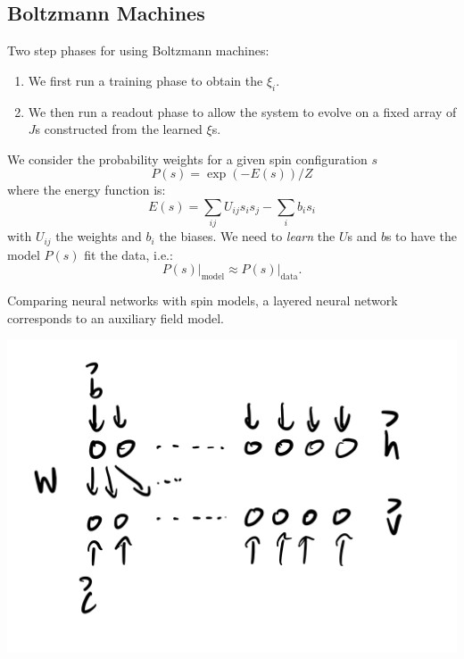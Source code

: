 \subsection{Boltzmann Machines}
Two step phases for using Boltzmann machines:
\begin{enumerate}
    \item We first run a training phase to obtain the $\xi_i$.
    \item We then run a readout phase to allow the system to evolve on a fixed array of $J$s constructed from the learned $\xi$s.
\end{enumerate}

We consider the probability weights for a given spin configuration $s$
\begin{equation}
    P(s) = \exp(-E(s))/Z
\end{equation}
where the energy function is:
\begin{equation}
    E(s) = \sum_{ij}U_{ij}s_is_j - \sum_i b_i s_i
\end{equation}
with $U_{ij}$ the weights and $b_i$ the biases. We need to \emph{learn} the $U$s and $b$s to have the model $P(s)$ fit the data, i.e.:
\begin{equation}
    \left.P(s)\right|_{\text{model}} \approx \left.P(s)\right|_{\text{data}}.
\end{equation}

Comparing neural networks with spin models, a layered neural network corresponds to an auxiliary field model.

\begin{center}
    \includegraphics[scale=0.35]{Lectures/Figures/lec15-NN.png}
\end{center}

